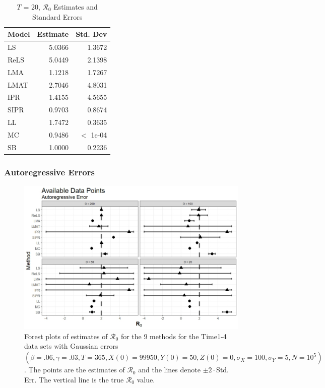 \documentclass[12pt]{article}
\newcommand{\xxsir}{\ensuremath{9} } %
\newcommand{\rr}{\ensuremath{\mathcal{R}_0}}
\begin{document}
\begin{table}[H]
	\centering
	\begin{tabular}[t]{l|r|r}
		\hline
		Model & Estimate & Std. Dev\\
		\hline
		LS & 5.0366 & 1.3672\\
		\hline
		ReLS & 5.0449 & 2.1398\\
		\hline
		LMA & 1.1218 & 1.7267\\
		\hline
		LMAT & 2.7046 & 4.8031\\
		\hline
		IPR & 1.4155 & 4.5655\\
		\hline
		SIPR & 0.9703 & 0.8674\\
		\hline
		LL & 1.7472 & 0.3635\\
		\hline
		MC & 0.9486 & $<$ 1e-04\\
		\hline
		SB & 1.0000 & 0.2236\\
		\hline
	\end{tabular}
	\caption{$T$ = 20, $\rr$ Estimates and Standard Errors}
\end{table}

\subsubsection{Autoregressive Errors}
\begin{figure}[H]
	\centering
	\includegraphics[scale=0.5]{images/time_ar.jpeg}
	\caption{Forest plots of estimates of $\rr$ for the \xxsir methods for the Time1-4 data sets with Gaussian errors $(\beta=.06, \gamma=.03, T=365, X(0)=99950, Y(0)=50, Z(0)=0, \sigma_X=100, \sigma_Y=5, N=10^5)$.  The points are the estimates of $\rr$ and the lines denote $\pm 2\cdot $Std. Err.  The vertical line is the true $\rr$ value.}
\end{figure}
\end{document}
